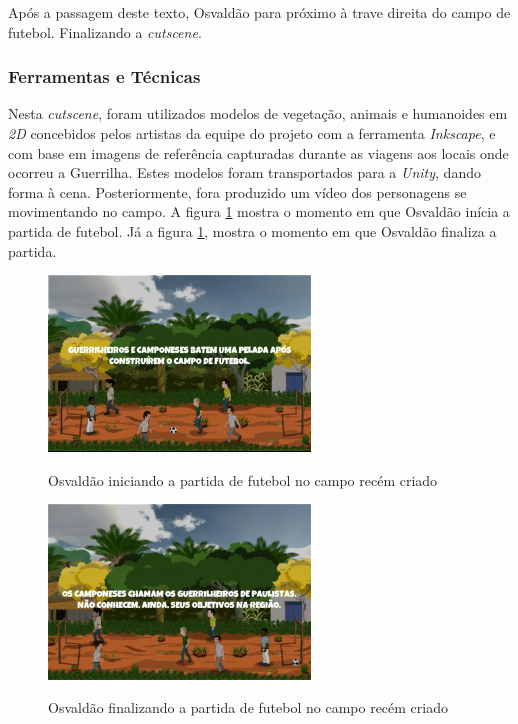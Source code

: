Após a passagem deste texto, Osvaldão para próximo à trave direita do campo de futebol. Finalizando a \textit{cutscene}.

\subsubsection{Ferramentas e Técnicas}

Nesta \textit{cutscene}, foram utilizados modelos de vegetação, animais e humanoides em \textit{2D} concebidos pelos artistas da equipe do projeto com a ferramenta \textit{Inkscape}, e com base em imagens de referência capturadas durante as viagens aos locais onde ocorreu a Guerrilha. Estes modelos foram transportados para a \textit{Unity}, dando forma à cena. Posteriormente, fora produzido um vídeo dos personagens se movimentando no campo. A figura \ref{fig:osvaldao_campo} mostra o momento em que Osvaldão inícia a partida de futebol. Já a figura \ref{fig:osvaldao_campo}, mostra o momento em que Osvaldão finaliza a partida.

\begin{figure}[H]
	\centering
	\caption{Osvaldão iniciando a partida de futebol no campo recém criado}
	\includegraphics[width=0.62\textwidth]{figuras/osvaldao_campo.png}
	\label{fig:osvaldao_campo}
	{}
\end{figure}

\begin{figure}[H]
	\centering
	\caption{Osvaldão finalizando a partida de futebol no campo recém criado}
	\includegraphics[width=0.62\textwidth]{figuras/osvaldao_campo_2.png}
	\label{fig:osvaldao_campo_2}
	{}
\end{figure}

